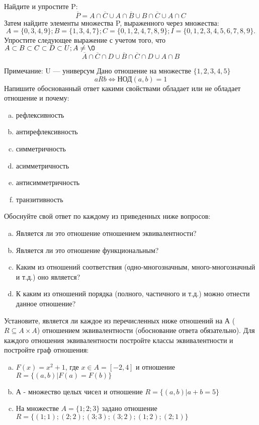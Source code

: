\documentclass[10pt]{exam}
\begin{document}
\begin{questions}
\question
Найдите и упростите P:
\begin{equation*}
\overline{P} = A \cap \overline{C} \cup A \cap \overline{B} \cup B \cap \overline{C} \cup A \cap C
\end{equation*}
Затем найдите элементы множества P, выраженного через множества:
\begin{equation*}
A = \{0, 3, 4, 9\}; 
B = \{1, 3, 4, 7\};
C = \{0, 1, 2, 4, 7, 8, 9\};
I = \{0, 1, 2, 3, 4, 5, 6, 7, 8, 9\}.
\end{equation*}\question
Упростите следующее выражение с учетом того, что $A\subset B \subset C \subset D \subset U; A \neq \O$
\begin{equation*}
\overline{A} \cap \overline{C} \cap D \cup \overline{B} \cap \overline{C} \cap D \cup A \cap B
\end{equation*}

Примечание: U — универсум\question
Дано отношение на множестве $\{1, 2, 3, 4, 5\}$ 
\begin{equation*}
aRb \iff  \text{НОД}(a,b) =1
\end{equation*}
Напишите обоснованный ответ какими свойствами обладает или не обладает отношение и почему:   
\begin{enumerate} [a)]\setcounter{enumi}{0}
\item рефлексивность
\item антирефлексивность
\item симметричность
\item асимметричность
\item антисимметричность
\item транзитивность
\end{enumerate}

Обоснуйте свой ответ по каждому из приведенных ниже вопросов:
\begin{enumerate} [a)]\setcounter{enumi}{0}
    \item Является ли это отношение отношением эквивалентности?
    \item Является ли это отношение функциональным?
    \item Каким из отношений соответствия (одно-многозначным, много-многозначный и т.д.) оно является?
    \item К каким из отношений порядка (полного, частичного и т.д.) можно отнести данное отношение?
\end{enumerate}


\question
Установите, является ли каждое из перечисленных ниже отношений на А ($R \subseteq A \times A$) отношением эквивалентности (обоснование ответа обязательно). Для каждого отношения эквивалентности постройте классы эквивалентности и постройте граф отношения:
\begin{enumerate} [a)]\setcounter{enumi}{0}
\item $F(x)=x^{2}+1$, где $x \in A = [-2, 4]$ и отношение $R = \{(a,b)|F(a) = F(b)\}$
\item А - множество целых чисел и отношение $R = \{(a,b)|a + b = 5\}$
\item На множестве $A = \{1; 2; 3\}$ задано отношение $R = \{(1; 1); (2; 2); (3; 3); (3; 2); (1; 2); (2; 1)\}$


\end{enumerate}
\end{questions}
\end{document}
